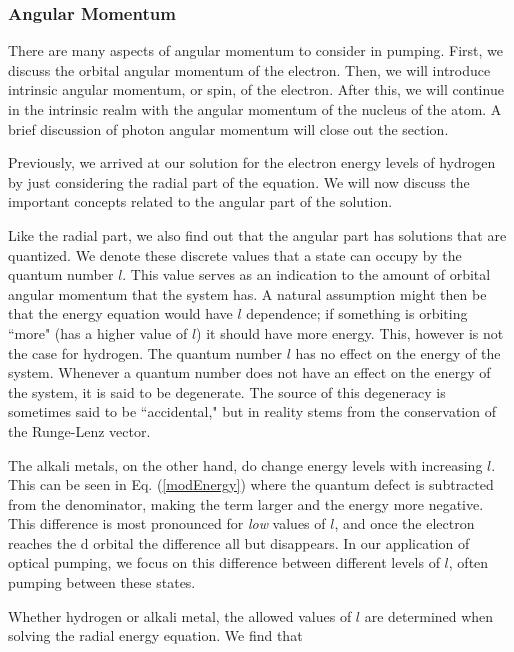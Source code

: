 \documentclass[12pt]{article}
\begin{document}
		\subsubsection{Angular Momentum}\label{angularMomentum}
		There are many aspects of angular momentum to consider
		in pumping. First, we discuss the orbital angular momentum of 
		the electron. Then, we will introduce intrinsic angular momentum,
		or spin, of the electron. After this, we will continue in the 
		intrinsic realm with the angular momentum of the nucleus of 
		the atom. A brief discussion of photon angular momentum will
		close out the section.

        Previously, we arrived at our solution for the electron energy 
		levels
        of hydrogen by just considering the radial part of the
        equation. We will now discuss the important concepts related
        to the angular part of the solution. 
        
        Like the radial part, 
        we also find out that the angular part has solutions that 
        are quantized. We denote these discrete values that a state
		can occupy by the quantum number $l$. This value serves as an
		indication to the amount of orbital angular momentum that the 
		system has. A natural assumption might then be that
		the energy equation would have $l$ dependence; if 
		something is orbiting ``more" (has a higher value 
		of $l$) it should have more energy. This, however is not
		the case for hydrogen. The quantum number $l$ has no effect on the 
		energy of the system. Whenever a quantum number does not
		have an effect on the energy of the system, it is said to
		be degenerate. The source of this degeneracy is sometimes said 
		to be ``accidental," but in reality stems from 
		the conservation of the Runge-Lenz vector.

		The alkali metals, on the other hand, do change energy levels with
		increasing $l$. This can be seen in Eq. (\ref{modEnergy}) where 
		the quantum defect
		is subtracted from the denominator, making the term larger and the
		energy more negative.
		This difference is most pronounced for \emph{low} values 
		of $l$, and once the electron reaches the d orbital the difference
		all but disappears. In our application of optical pumping,
		we focus on this difference between different levels of $l$,
		often pumping between these states.
		
		Whether hydrogen or alkali metal, the allowed 
		values of $l$ are determined when solving
		the radial energy equation. We find that
\end{document}
